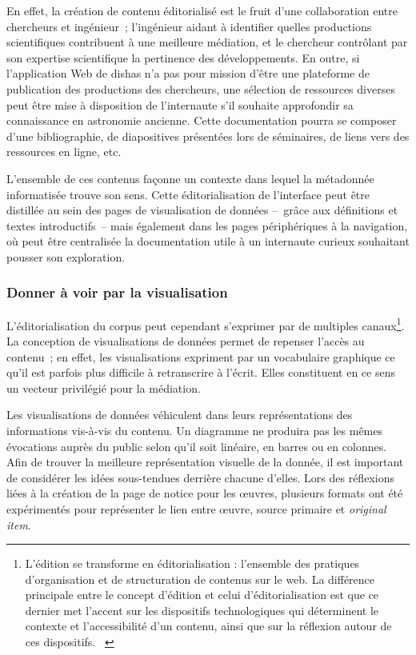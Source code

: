 \documentclass[a4paper,12pt,twoside]{book}
\newcommand{\eng}{\emph}
\newcommand{\oi}{\eng{original item}\xspace}
\newcommand{\g}[1]{\og#1~\fg}
\newcommand{\dishas}{\gls{dishas}\xspace}
\begin{document}
En effet, la création de contenu éditorialisé est le fruit d'une collaboration entre chercheurs et ingénieur~; l'ingénieur aidant à identifier quelles productions scientifiques contribuent à une meilleure médiation, et le chercheur contrôlant par son expertise scientifique la pertinence des développements. En outre, si l'application Web de \dishas n'a pas pour mission d'être une plateforme de publication des productions des chercheurs, une sélection de ressources diverses peut être mise à disposition de l'internaute s'il souhaite approfondir sa connaissance en astronomie ancienne. Cette documentation pourra se composer d'une bibliographie, de diapositives présentées lors de séminaires, de liens vers des ressources en ligne, etc.

L'ensemble de ces contenus façonne un contexte dans lequel la métadonnée informatisée trouve son sens. Cette éditorialisation de l'interface peut être distillée au sein des pages de visualisation de données –~grâce aux définitions et textes introductifs~– mais également dans les pages périphériques à la navigation, où peut être centralisée la documentation utile à un internaute curieux souhaitant pousser son exploration.

			\subsubsection{Donner à voir par la visualisation}
L'éditorialisation du corpus peut cependant s'exprimer par de multiples canaux\footnote{\g{L’édition se transforme en éditorialisation : l’ensemble des pratiques d’organisation et de structuration de contenus sur le web. La différence principale entre le concept d’édition et celui d’éditorialisation est que ce dernier met l’accent sur les dispositifs technologiques qui déterminent le contexte et l’accessibilité d’un contenu, ainsi que sur la réflexion autour de ces dispositifs.} \cite[§~20]{sinatraChapitreHistoireHumanites2014}}. La conception de visualisations de données permet de repenser l'accès au contenu~; en effet, les visualisations expriment par un vocabulaire graphique ce qu'il est parfois plus difficile à retranscrire à l'écrit. Elles constituent en ce sens un vecteur privilégié pour la médiation.

Les visualisations de données véhiculent dans leurs représentations des informations vis-à-vis du contenu. Un diagramme ne produira pas les mêmes évocations auprès du public selon qu'il soit linéaire, en barres ou en colonnes. Afin de trouver la meilleure représentation visuelle de la donnée, il est important de considérer les idées sous-tendues derrière chacune d'elles. Lors des réflexions liées à la création de la page de notice pour les œuvres, plusieurs formats ont été expérimentés pour représenter le lien entre œuvre, source primaire et \oi.
\end{document}
